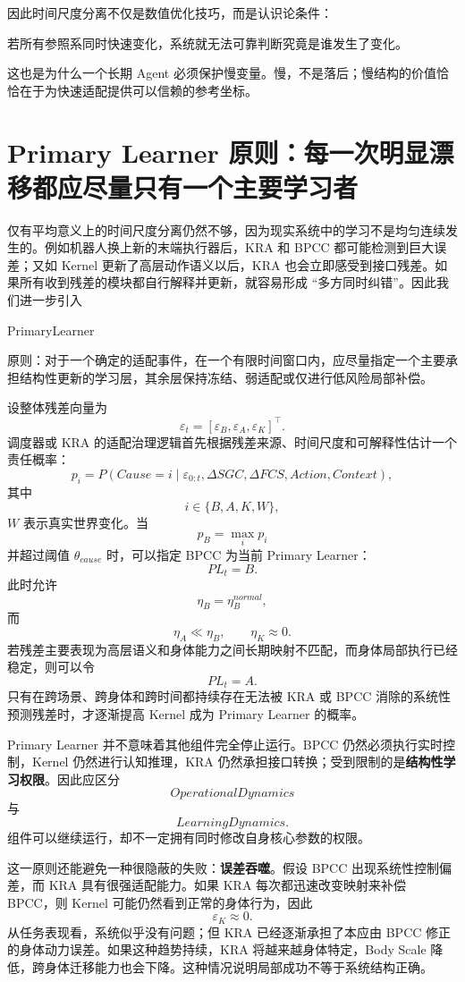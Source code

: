 因此时间尺度分离不仅是数值优化技巧，而是认识论条件：
\begin{statementbox}
若所有参照系同时快速变化，系统就无法可靠判断究竟是谁发生了变化。
\end{statementbox}
这也是为什么一个长期 Agent 必须保护慢变量。慢，不是落后；慢结构的价值恰恰在于为快速适配提供可以信赖的参考坐标。

\section{Primary Learner 原则：每一次明显漂移都应尽量只有一个主要学习者}

仅有平均意义上的时间尺度分离仍然不够，因为现实系统中的学习不是均匀连续发生的。例如机器人换上新的末端执行器后，KRA 和 BPCC 都可能检测到巨大误差；又如 Kernel 更新了高层动作语义以后，KRA 也会立即感受到接口残差。如果所有收到残差的模块都自行解释并更新，就容易形成 ``多方同时纠错''。因此我们进一步引入
\begin{statementbox}
PrimaryLearner
\end{statementbox}
原则：对于一个确定的适配事件，在一个有限时间窗口内，应尽量指定一个主要承担结构性更新的学习层，其余层保持冻结、弱适配或仅进行低风险局部补偿。

设整体残差向量为
\[
\varepsilon_t
=
\left[
\varepsilon_B,
\varepsilon_A,
\varepsilon_K
\right]^{\top}.
\]
调度器或 KRA 的适配治理逻辑首先根据残差来源、时间尺度和可解释性估计一个责任概率：
\[
p_i
=
P
\left(
Cause=i
\mid
\varepsilon_{0:t},
\Delta SGC,
\Delta FCS,
Action,
Context
\right),
\]
其中
\[
i\in\{B,A,K,W\},
\]
$W$ 表示真实世界变化。当
\[
p_B
=
\max_i p_i
\]
并超过阈值 $\theta_{cause}$ 时，可以指定 BPCC 为当前 Primary Learner：
\[
PL_t=B.
\]
此时允许
\[
\eta_B=\eta_B^{normal},
\]
而
\[
\eta_A\ll\eta_B,
\qquad
\eta_K\approx 0.
\]
若残差主要表现为高层语义和身体能力之间长期映射不匹配，而身体局部执行已经稳定，则可以令
\[
PL_t=A.
\]
只有在跨场景、跨身体和跨时间都持续存在无法被 KRA 或 BPCC 消除的系统性预测残差时，才逐渐提高 Kernel 成为 Primary Learner 的概率。

Primary Learner 并不意味着其他组件完全停止运行。BPCC 仍然必须执行实时控制，Kernel 仍然进行认知推理，KRA 仍然承担接口转换；受到限制的是\textbf{结构性学习权限}。因此应区分
\[
OperationalDynamics
\]
与
\[
LearningDynamics.
\]
组件可以继续运行，却不一定拥有同时修改自身核心参数的权限。

这一原则还能避免一种很隐蔽的失败：\textbf{误差吞噬}。假设 BPCC 出现系统性控制偏差，而 KRA 具有很强适配能力。如果 KRA 每次都迅速改变映射来补偿 BPCC，则 Kernel 可能仍然看到正常的身体行为，因此
\[
\varepsilon_K\approx 0.
\]
从任务表现看，系统似乎没有问题；但 KRA 已经逐渐承担了本应由 BPCC 修正的身体动力误差。如果这种趋势持续，KRA 将越来越身体特定，Body Scale 降低，跨身体迁移能力也会下降。这种情况说明局部成功不等于系统结构正确。

